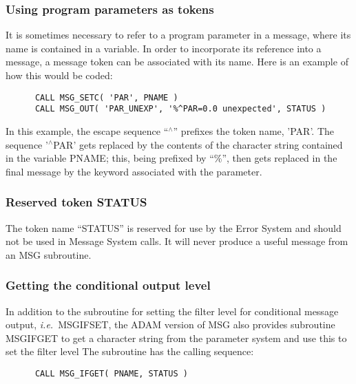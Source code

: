 \documentclass[twoside,11pt]{article}
\newcommand{\xlabel}[1]{}
\renewcommand{\_}{\texttt{\symbol{95}}}
\begin{document}
\subsubsection{\xlabel{using_program_parameters_as_tokens}Using program parameters as tokens}

It is sometimes necessary to refer to a program parameter in a message, where
its name is contained in a variable. 
In order to incorporate its reference into a message, a message token can be
associated with its name. 
Here is an example of how this would be coded:

\begin {small}
\begin{verbatim}
      CALL MSG_SETC( 'PAR', PNAME )
      CALL MSG_OUT( 'PAR_UNEXP', '%^PAR=0.0 unexpected', STATUS )
\end{verbatim}
\end {small}

In this example, the escape sequence ``$^\wedge$'' prefixes the token name,
'PAR'. 
The sequence '$^\wedge$PAR' gets replaced by the contents of the character
string contained in the variable PNAME; this, being prefixed by ``\%'', then
gets replaced in the final message by the keyword associated with the
parameter. 


\subsubsection{\xlabel{reserved_token_status}Reserved token STATUS}

The token name ``STATUS'' is reserved for use by the Error System and should
not be used in Message System calls. It will never produce a useful message
from an MSG subroutine.


\subsubsection{\xlabel{getting_the_conditional_output_level}Getting the conditional output level}

In addition to the subroutine for setting the filter level for conditional
message output, \textit{i.e.}\ MSG\_IFSET, the ADAM version of MSG also provides 
subroutine MSG\_IFGET to get a character string from the parameter system and
use this to set the filter level
The subroutine has the calling sequence:

\begin {small}
\begin{verbatim}
      CALL MSG_IFGET( PNAME, STATUS )
\end{verbatim}
\end {small}
\end{document}
